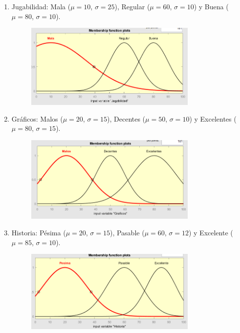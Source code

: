 \documentclass[11pt, letterpaper]{article}
\begin{document}
\begin{enumerate}
	\item Jugabilidad: Mala ($\mu = 10$, $\sigma = 25$), Regular ($\mu = 60$, $\sigma = 10$) y Buena ($\mu = 80$, $\sigma = 10$).
	\begin{figure}[h]
		\centering
		\includegraphics[width=0.8\textwidth]{IMG/P11.png}
	\end{figure}
	\newpage
	\item Gráficos: Malos ($\mu = 20$, $\sigma = 15$), Decentes ($\mu = 50$, $\sigma = 10$) y Excelentes ($\mu = 80$, $\sigma = 15$).
	\begin{figure}[h]
		\centering
		\includegraphics[width=0.8\textwidth]{IMG/P12.png}
	\end{figure}
	\item Historia: Pésima ($\mu = 20$, $\sigma = 15$), Pasable ($\mu = 60$, $\sigma = 12$) y Excelente ($\mu = 85$, $\sigma = 10$).
	\begin{figure}[h]
		\centering
		\includegraphics[width=0.8\textwidth]{IMG/P13.png}

\end{figure}
\end{enumerate}
\end{document}
